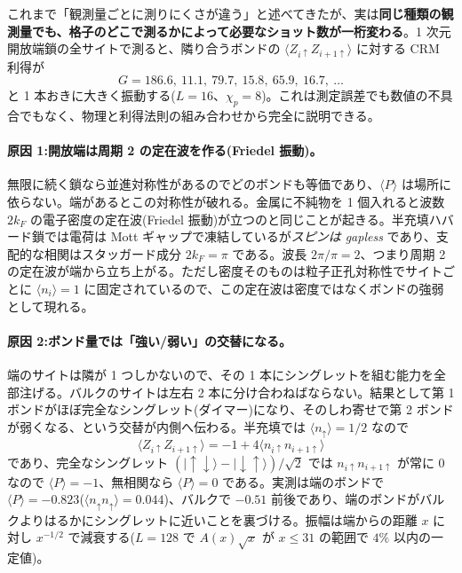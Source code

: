 \documentclass[11pt,a4paper]{ltjsarticle}
\newcommand{\ket}[1]{|#1\rangle}
\newcommand{\ev}[1]{\langle #1\rangle}
\newcommand{\up}{\uparrow}
\newcommand{\dn}{\downarrow}
\begin{document}
これまで「観測量ごとに測りにくさが違う」と述べてきたが、実は\textbf{同じ種類の観測量でも、格子のどこで測るかによって必要なショット数が一桁変わる}。1 次元開放端鎖の全サイトで測ると、隣り合うボンドの $\ev{Z_{i\up}Z_{i+1\up}}$ に対する CRM 利得が
\[
  G = 186.6,\ 11.1,\ 79.7,\ 15.8,\ 65.9,\ 16.7,\ \dots
\]
と 1 本おきに大きく振動する($L=16$、$\chi_p=8$)。これは測定誤差でも数値の不具合でもなく、物理と利得法則の組み合わせから完全に説明できる。

\paragraph{原因 1:開放端は周期 2 の定在波を作る(Friedel 振動)。}
無限に続く鎖なら並進対称性があるのでどのボンドも等価であり、$\ev{P}$ は場所に依らない。端があるとこの対称性が破れる。金属に不純物を 1 個入れると波数 $2k_F$ の電子密度の定在波(Friedel 振動)が立つのと同じことが起きる。半充填ハバード鎖では電荷は Mott ギャップで凍結しているが\emph{スピンは gapless} であり、支配的な相関はスタッガード成分 $2k_F=\pi$ である。波長 $2\pi/\pi=2$、つまり周期 2 の定在波が端から立ち上がる。ただし密度そのものは粒子正孔対称性でサイトごとに $\ev{n_i}=1$ に固定されているので、この定在波は密度ではなくボンドの強弱として現れる。

\paragraph{原因 2:ボンド量では「強い/弱い」の交替になる。}
端のサイトは隣が 1 つしかないので、その 1 本にシングレットを組む能力を全部注げる。バルクのサイトは左右 2 本に分け合わねばならない。結果として第 1 ボンドがほぼ完全なシングレット(ダイマー)になり、そのしわ寄せで第 2 ボンドが弱くなる、という交替が内側へ伝わる。半充填では $\ev{n_\up}=1/2$ なので
\begin{equation}
  \ev{Z_{i\up}Z_{i+1\up}} = -1 + 4\ev{n_{i\up}n_{i+1\up}}
\end{equation}
であり、完全なシングレット $(\ket{\up\dn}-\ket{\dn\up})/\sqrt2$ では $n_{i\up}n_{i+1\up}$ が常に $0$ なので $\ev{P}=-1$、無相関なら $\ev{P}=0$ である。実測は端のボンドで $\ev{P}=-0.823$($\ev{n_\up n_\up}=0.044$)、バルクで $-0.51$ 前後であり、端のボンドがバルクよりはるかにシングレットに近いことを裏づける。振幅は端からの距離 $x$ に対し $x^{-1/2}$ で減衰する($L=128$ で $A(x)\sqrt x$ が $x\le31$ の範囲で $4\%$ 以内の一定値)。
\end{document}
